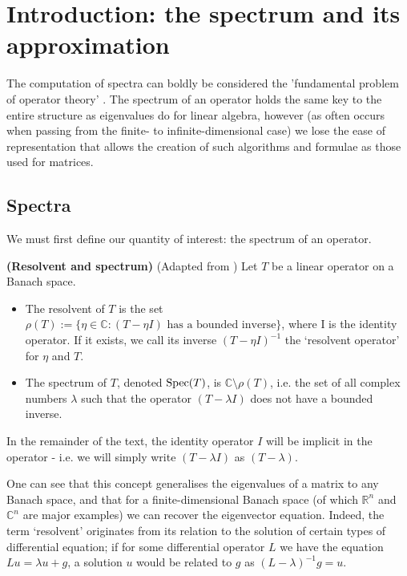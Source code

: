 \documentclass[../main.tex]{subfiles}
\begin{document}
\section{Introduction: the spectrum and its approximation}
The computation of spectra can boldly be considered the 'fundamental problem of operator theory' \parencite{arveson2002short}. The spectrum
of an operator holds the same key to the entire structure as eigenvalues do for linear algebra, however (as often occurs when passing from 
the finite- to infinite-dimensional case) we lose the ease of representation that allows the creation of such algorithms and formulae as those 
used for matrices. 

\subsection{Spectra}

We must first define our quantity of interest: the spectrum of an operator.
\begin{definition}{\textbf{(Resolvent and spectrum)}}
(Adapted from \parencite{edmunds2018spectral}) Let $T$ be a linear operator on a Banach space.
\begin{itemize}
\item The resolvent of $T$ is the set $\rho(T) := \{\eta \in \mathbb{C} : (T - \eta I)\text{ has a bounded inverse}\}$, where I is the identity operator. 
If it exists, we call its inverse $(T - \eta I)^{-1}$ the `resolvent operator' for $\eta$ and $T$.
\item The spectrum of $T$, denoted $\mathrm{Spec}(T)$, is $\mathbb{C} \setminus \rho(T)$, i.e. the set of all complex numbers $\lambda$ such 
that the operator $(T - \lambda I)$ does not have a bounded inverse.
\end{itemize}
\end{definition}

In the remainder of the text, the identity operator $I$ will be implicit in the operator - i.e. we will simply write $(T - \lambda I)$ as $(T - \lambda)$.

One can see that this concept generalises the eigenvalues of a matrix to any Banach space, and that for a finite-dimensional Banach space
(of which $\mathbb{R}^n$ and $\mathbb{C}^n$ are major examples) we can recover the eigenvector equation. Indeed, the term `resolvent'
originates from its relation to the solution of certain types of differential equation; if for some differential operator $L$ we have the equation
$Lu = \lambda u + g$, a solution $u$ would be related to $g$ as $(L - \lambda)^{-1}g = u$. 
\end{document}
